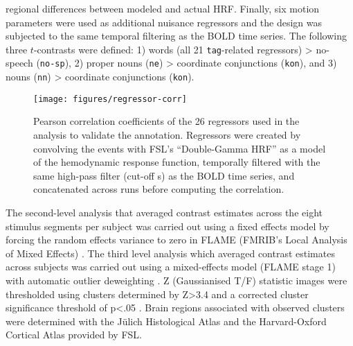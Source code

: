 \documentclass[10pt,a4paper,onecolumn]{article}
\begin{document}
regional differences between modeled and actual HRF.
Finally, six motion parameters were used as additional nuisance regressors and
the design was subjected to the same temporal filtering as the BOLD time series.
The following three $t$-contrasts were defined: 1) words (all 21
\texttt{tag}-related regressors) > no-speech (\texttt{no-sp}),
2) proper nouns (\texttt{ne}) > coordinate conjunctions (\texttt{kon}), and
3) nouns (\texttt{nn}) > coordinate conjunctions (\texttt{kon}).

\begin{figure*} \centering
    \texttt{[image: figures/regressor-corr]} \caption{Pearson
        correlation coefficients of the 26 regressors used in the analysis to
        validate the annotation. Regressors were created by convolving the
        events with FSL's ``Double-Gamma HRF'' as a model of the hemodynamic
        response function, temporally filtered with the same high-pass filter
        (cut-off \unit[150]{s}) as the BOLD time series, and concatenated across
    runs before computing the correlation.}
    \label{fig:reg-corr}
\end{figure*}


The second-level analysis that averaged contrast estimates across the eight
stimulus segments per subject was carried out using a fixed effects model by
forcing the random effects variance to zero in FLAME (FMRIB's Local Analysis of
Mixed Effects) \citep{beckmann2003general, woolrich2004multilevel}.
The third level analysis which averaged contrast estimates across subjects was
carried out using a mixed-effects model (FLAME stage 1) with automatic outlier deweighting
\citep{woolrich2004multilevel, woolrich2008robust}.
Z (Gaussianised T/F) statistic images were thresholded using clusters determined
by Z>3.4 and a corrected cluster significance threshold of p<.05
\citep{woolrich2008robust}.
Brain regions associated with observed clusters were determined with the Jülich
Histological Atlas \citep{eickhoff2005toolbox,eickhoff2007assignment} and the
Harvard-Oxford Cortical Atlas \citep{desikan2006automated} provided by FSL.
\end{document}
